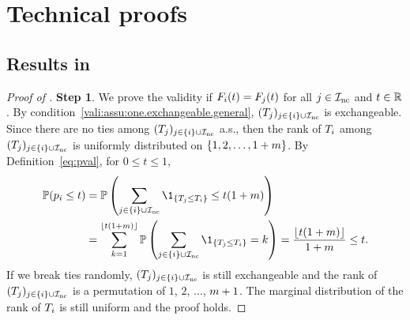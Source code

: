 \renewcommand\thefigure{\thesection.\arabic{figure}}

\section{Technical proofs}\label{sec:appendix}


\subsection{Results in }


\begin{proof}[Proof of ]
\textbf{Step 1}. We prove the validity if ${F_{i}}(t) = {F_{j}}(t)$ for all $j \in {\mathcal{I}_{\text{nc}}}$ and $t \in \mathbb{R}$.
By condition~\ref{vali:assu:one.exchangeable.general}, $({T_{j}})_{j \in \{i\} \cup {\mathcal{I}_{\text{nc}}}}$ is exchangeable.
Since there are no ties among $({T_{j}})_{j \in \{i\} \cup {\mathcal{I}_{\text{nc}}}}$ a.s., then the rank of ${T_{i}}$ among $({T_{j}})_{j \in \{i\} \cup {\mathcal{I}_{\text{nc}}}}$ is uniformly distributed on $\{1, 2, \ldots, 1+m\}$. By Definition~\eqref{eq:pval},
for $0 \le t \le 1$,
\begin{align*}
    \PP(\pval{i} \le t)
    &= \PP\left(\sum_{j \in \{i\} \cup \hypothesisIndex{\text{nc}}} \1_{\{\testStatistics{j} \le \testStatistics{i}\}}
    \le t(1+\NoNc)\right) \\
    &= \sum_{k=1}^{\lfloor t(1+\NoNc) \rfloor}\PP\left(\sum_{j \in \{i\} \cup\hypothesisIndex{\text{nc}}} \1_{\{\testStatistics{j}
    \le \testStatistics{i}\}}
    = k \right)
    = \frac{\lfloor t(1+\NoNc)\rfloor}{1+\NoNc}
    \le t.
\end{align*}
If we break ties randomly, $({T_{j}})_{j \in \{i\} \cup {\mathcal{I}_{\text{nc}}}}$ is still exchangeable and the rank of $({T_{j}})_{j \in \{i\} \cup {\mathcal{I}_{\text{nc}}}}$ is a permutation of $1$, $2$, $\ldots$, $m+1$.
The marginal distribution of the rank of ${T_{i}}$ is still uniform and the proof holds.



\end{proof}
